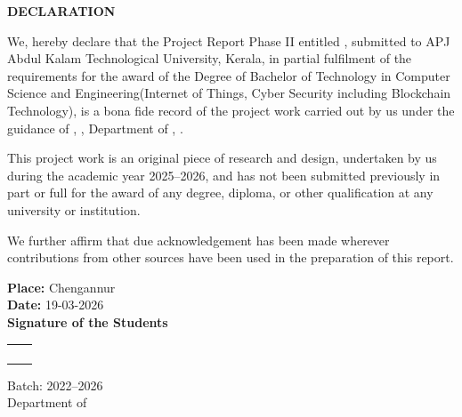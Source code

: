 \begin{center}
	\Large\textbf{DECLARATION}
\end{center}

We, hereby declare that the Project Report Phase II entitled \textbf{\thetitle}, submitted to APJ Abdul Kalam Technological University, Kerala, in partial fulfilment of the requirements for the award of the Degree of Bachelor of Technology in Computer Science and Engineering(Internet of Things, Cyber Security including Blockchain Technology), is a bona fide record of the project work carried out by us under the guidance of \theprojectguide, \projectguidedesignation, Department of \thedepartment, \thecollege.

This project work is an original piece of research and design, undertaken by us during the academic year 2025--2026, and has not been submitted previously in part or full for the award of any degree, diploma, or other qualification at any university or institution.

We further affirm that due acknowledgement has been made wherever contributions from other sources have been used in the preparation of this report.

\vspace{1cm}

\textbf{Place:} Chengannur\\
\textbf{Date:} 19-03-2026\\

\textbf{Signature of the Students}\\

\begin{tabular}{l r}
	\fontsize{12pt}{12pt}\selectfont\textbf{\studentA} & \regA \\
	\fontsize{12pt}{12pt}\selectfont\textbf{\studentB} & \regB \\
	\fontsize{12pt}{12pt}\selectfont\textbf{\studentC} & \regC \\
	\fontsize{12pt}{12pt}\selectfont\textbf{\studentD} & \regD \\
\end{tabular}

\vspace{1cm}

Batch: 2022--2026\\
Department of \thedepartment\\
\thecollege
	
